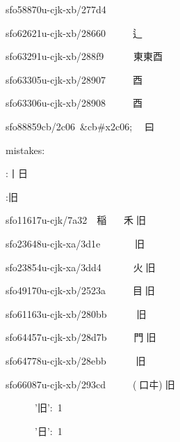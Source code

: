 \begin{multicols}{3}
{sfo58870u-cjk-xb/277d4  {}   {\cnxJzr{}}{}\par
sfo62621u-cjk-xb/28660  {}   {\cnxJzr{}}{\cjk{}辶{\cnxb{}𣍘}}\par
sfo63291u-cjk-xb/288f9  {}   {\cnxJzr{}}{\cnxJzr{}}{\cjk{}東東酉}\par
sfo63305u-cjk-xb/28907  {}   {\cnxJzr{}}{\cjk{}酉{\cnxb{}𣍘}}\par
sfo63306u-cjk-xb/28908  {}   {\cnxJzr{}}{酉}\par
sfo88859cb/2c06 \&cb\#x2c06;  {\cnxJzr{}}{曰}\par
\null\par
mistakes:\par
{}:{丨日}\par
{}:{旧}\par
\null\par
sfo11617u-cjk/7a32  {\cjk{}稲}   {\cnxJzr{}}{\cjk{}禾}{\cnxJzr{}}{旧}\par
sfo23648u-cjk-xa/3d1e   {}   {\cnxJzr{}}{}{\cnxJzr{}}{旧}\par
sfo23854u-cjk-xa/3dd4   {}   {\cnxJzr{}}{\cjk{}火}{\cnxJzr{}}{旧}\par
sfo49170u-cjk-xb/2523a  {}   {\cnxJzr{}}{\cjk{}目}{\cnxJzr{}}{旧}\par
sfo61163u-cjk-xb/280bb  {}   {\cnxJzr{}}{}{\cnxJzr{}}{旧}\par
sfo64457u-cjk-xb/28d7b  {}   {\cnxJzr{}}{\cjk{}門}{\cnxJzr{}}{旧}\par
sfo64778u-cjk-xb/28ebb  {}   {\cnxJzr{}}{}{\cnxJzr{}}{旧}\par
sfo66087u-cjk-xb/293cd  {}   {\cnxJzr{}}({\cnxJzr{}}{口{\cnxa{}㐄}}){\cnxJzr{}}{旧}\par
\null\par
      '{\cjk{}旧}': 1\par
      '{\cjk{}日}': 1\par
}
\end{multicols}
